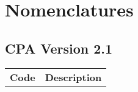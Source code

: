 \chapter{Nomenclatures}

\section{CPA Version 2.1}

\begin{tabular}{l|c}%
    \bfseries Code & \bfseries Description%
\end{tabular}